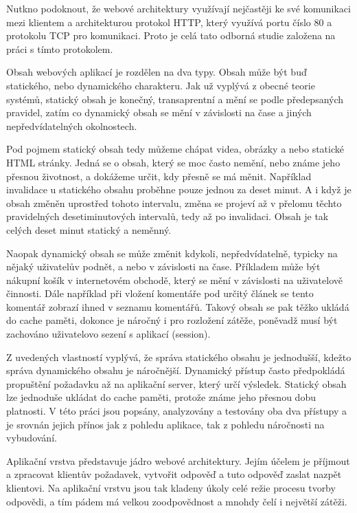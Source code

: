 \documentclass[12pt]{article}
\begin{document}
\obrazek
{}

Nutkno podoknout, že webové architektury využívají nejčastěji ke své komunikaci mezi klientem a architekturou protokol HTTP, který využívá portu číslo 80 a protokolu TCP pro komunikaci. Proto je celá tato odborná studie založena na práci s tímto protokolem.

Obsah webových aplikací je rozdělen na dva typy. Obsah může být buď statického, nebo dynamického charakteru. Jak už vyplývá z obecné teorie systémů, statický obsah je konečný, transaprentní a mění se podle předepsaných pravidel, zatím co dynamický obsah se mění v závislosti na čase a jiných nepředvídatelných okolnostech. 

Pod pojmem statický obsah tedy můžeme chápat videa, obrázky a nebo statické HTML stránky. Jedná se o obsah, který se moc často nemění, nebo známe jeho přesnou životnost, a dokážeme určit, kdy přesně se má měnit. Například invalidace u statického obsahu proběhne pouze jednou za deset minut. A i když je obsah změněn uprostřed tohoto intervalu, změna se projeví až v přelomu těchto pravidelných desetiminutových intervalů, tedy až po invalidaci. Obsah je tak celých deset minut statický a neměnný.

Naopak dynamický obsah se může změnit kdykoli, nepředvídatelně, typicky na nějaký uživatelův podnět, a nebo v závislosti na čase. Příkladem může být nákupní košík v internetovém obchodě, který se mění v závislosti na uživatelově činnosti. Dále například při vložení komentáře pod určitý článek se tento komentář zobrazí ihned v seznamu komentářů. Takový obsah se pak těžko ukládá do cache paměti, dokonce je náročný i pro rozložení zátěže, poněvadž musí být zachováno uživatelovo sezení s aplikací (session).

Z uvedených vlastností vyplývá, že správa statického obsahu je jednodušší, kdežto správa dynamického obsahu je náročnější. Dynamický přístup často předpokládá propuštění požadavku až na aplikační server, který určí výsledek. Statický obsah lze jednoduše ukládat do cache paměti, protože známe jeho přesnou dobu platnosti. V této práci jsou popsány, analyzovány a testovány oba dva přístupy a je srovnán jejich přínos jak z pohledu aplikace, tak z pohledu náročnosti na vybudování.

Aplikační vrstva představuje jádro webové architektury. Jejím účelem je příjmout a zpracovat klientův požadavek, vytvořit odpověď a tuto odpověď zaslat nazpět klientovi. Na aplikační vrstvu jsou tak kladeny úkoly celé režie procesu tvorby odpovědi, a tím pádem má velkou zoodpovědnost a mnohdy čelí i největší zátěži.
\end{document}
